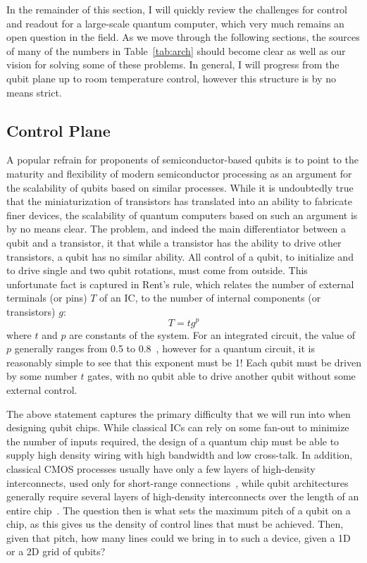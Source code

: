 In the remainder of this section, I will quickly review the challenges for control and readout for a large-scale quantum computer, which very much remains
an open question in the field. As we move through the following sections, the sources of many of the numbers in Table~\ref{tab:arch} should become clear
as well as our vision for solving some of these problems. In general, I will progress from the qubit plane up to room temperature control, however this
structure is by no means strict.

\subsection{Control Plane}
\label{sec:control}
A popular refrain for proponents of semiconductor-based qubits is to point to the maturity and flexibility of modern semiconductor processing as an argument
for the scalability of qubits based on similar processes. While it is undoubtedly true that the miniaturization of transistors has translated into an ability
to fabricate finer devices, the scalability of quantum computers based on such an argument is by no means clear. The problem, and indeed the main differentiator
between a qubit and a transistor, it that while a transistor has the ability to drive other transistors, a qubit has no similar ability. All control of a qubit,
to initialize and to drive single and two qubit rotations, must come from outside. This unfortunate fact is captured in Rent's rule, which relates the number of
external terminals (or pins) $T$ of an IC, to the number of internal components (or transistors) $g$:
\begin{equation}
  T = tg^p
  \label{eq:rent}
\end{equation}
where $t$ and $p$ are constants of the system. For an integrated circuit, the value of $p$ generally ranges from 0.5 to 0.8~\cite{5388820}, however for a quantum
circuit, it is reasonably simple to see that this exponent must be 1! Each qubit must be driven by some number $t$ gates, with no qubit able to drive another
qubit without some external control.

The above statement captures the primary difficulty that we will run into when designing qubit chips. While classical ICs can rely on some fan-out to minimize
the number of inputs required, the design of a quantum chip must be able to supply high density wiring with high bandwidth and low cross-talk. In addition,
classical CMOS processes usually have only a few layers of high-density interconnects, used only for short-range connections~\cite{5424258}, while qubit
architectures generally require several layers of high-density interconnects over the length of an entire chip~\cite{s41467-017-01905-6}. The question then is
what sets the maximum pitch of a qubit on a chip, as this gives us the density of control lines that must be achieved. Then, given that pitch, how many lines could
we bring in to such a device, given a 1D or a 2D grid of qubits?

